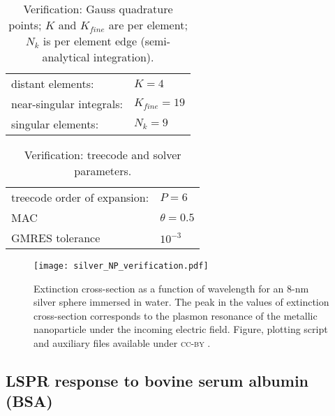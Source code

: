 \begin{table}[h]
    \centering
    \caption{\label{table:quadparams2} Verification: Gauss quadrature points; 
    $K$ and $K_{fine}$ are per element; $N_k $ is per element edge (semi-analytical integration). } 
    \begin{tabular}{l l}
    \hline%
     distant elements: & $K=4$ \\
     near-singular integrals:   & $ K_{fine}=19$ \\
     singular elements:  & $N_k =9$ \\
    \hline%
    \end{tabular}
\end{table}


\begin{table}[h]
    \centering
    \caption{\label{table:treeparams2} Verification: treecode and solver parameters.} 
    \begin{tabular}{l l}
    \hline%
    treecode order of expansion: & $P=6$\\
    MAC                                         & $\theta=0.5$\\
    GMRES tolerance                    & $10^{-3}$\\
    \hline%
    \end{tabular}
\end{table}


\begin{figure}[h] %
   \centering
   \texttt{[image: silver\_NP\_verification.pdf]} 
   \caption{Extinction cross-section as a function of wavelength for an $8$-nm
            silver sphere immersed in water. The peak in the values of extinction cross-section corresponds to the plasmon resonance of the metallic nanoparticle under the incoming electric field. Figure, plotting script and auxiliary files available under \textsc{cc-by} \cite{ClementiETal2018d}.}
   \label{fig:verif_sphere}
\end{figure}




\subsection{LSPR response to bovine serum albumin (BSA)} \label{sec:lspr_response}

